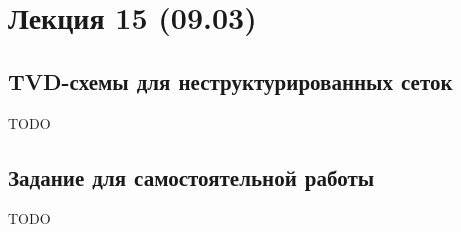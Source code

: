 \section{Лекция 15 (09.03)}

\subsection{TVD-схемы для неструктурированных сеток}
TODO

\subsection{Задание для самостоятельной работы}
TODO
